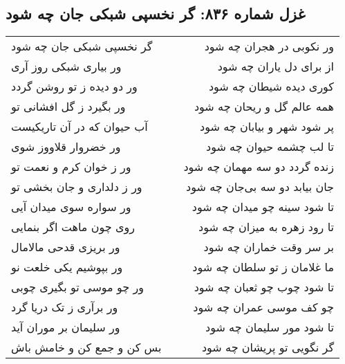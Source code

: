 \begin{center}
\section*{غزل شماره ۸۳۶: گر نخسپی شبکی جان چه شود}
\label{sec:0836}
\begin{longtable}{l p{0.5cm} r}
گر نخسپی شبکی جان چه شود
&&
ور نکوبی در هجران چه شود
\\
ور بیاری شبکی روز آری
&&
از برای دل یاران چه شود
\\
ور دو دیده ز تو روشن گردد
&&
کوری دیده شیطان چه شود
\\
ور بگیرد ز گل افشانی تو
&&
همه عالم گل و ریحان چه شود
\\
آب حیوان که در آن تاریکیست
&&
پر شود شهر و بیابان چه شود
\\
ور خضروار قلاووز شوی
&&
تا لب چشمه حیوان چه شود
\\
ور ز خوان کرم و نعمت تو
&&
زنده گردد دو سه مهمان چه شود
\\
ور ز دلداری و جان بخشی تو
&&
جان بیابد دو سه بی‌جان چه شود
\\
ور سواره سوی میدان آیی
&&
تا شود سینه چو میدان چه شود
\\
روی چون ماهت اگر بنمایی
&&
تا رود زهره به میزان چه شود
\\
ور بریزی قدحی مالامال
&&
بر سر وقت خماران چه شود
\\
ور بپوشیم یکی خلعت نو
&&
ما غلامان ز تو سلطان چه شود
\\
ور چو موسی تو بگیری چوبی
&&
تا شود چوب چو ثعبان چه شود
\\
ور برآری ز تک دریا گرد
&&
چو کف موسی عمران چه شود
\\
ور سلیمان بر موران آید
&&
تا شود مور سلیمان چه شود
\\
بس کن و جمع کن و خامش باش
&&
گر نگویی تو پریشان چه شود
\\
\end{longtable}
\end{center}
